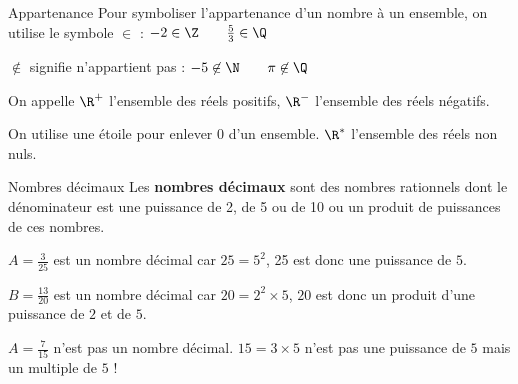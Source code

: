 \begin{pageCours}
%
%

 

\begin{DefT}{Appartenance}
Pour symboliser l'appartenance d'un nombre à un ensemble, on utilise le symbole $\in$ : 
$-2 \in \Z \quad \quad \frac{5}{3} \in \Q $ 
 
 $ \not\in $ signifie n'appartient pas : $-5 \not \in \N \quad \quad \pi \not\in \Q$
\end{DefT}


\begin{Nt}

\begin{description}[leftmargin=*]
\item  On appelle $\R^+$ l'ensemble des réels positifs, $\R^-$ l'ensemble des réels négatifs.
\item  On utilise une étoile pour enlever 0 d'un ensemble. $\R^*$ l'ensemble des réels non nuls.
\end{description}

\end{Nt}

\begin{DefT}{Nombres décimaux}
Les \textbf{nombres décimaux} sont des nombres rationnels dont le dénominateur est une puissance de 2, de 5 ou de 10 ou un produit de puissances de ces nombres.
\end{DefT}

\begin{Ex}
\begin{description}[leftmargin=*]
\item  $A=\frac{3}{25}$ est un nombre décimal car $25 = 5^2$, 25 est donc une puissance de $5$.
\item  $B=\frac{13}{20}$ est un nombre décimal car $20 = 2^2 \times 5$, $20$ est donc un produit d'une puissance de $2$ et de $5$.
\end{description}
\end{Ex}

\begin{Att}

$A=\frac{7}{15}$ n'est pas un nombre décimal. $15=3 \times 5$ n'est pas une puissance de $5$ mais un multiple de $5$ !


\end{Att}
\end{pageCours}
